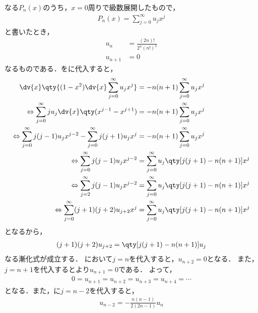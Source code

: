 \documentclass{report}
\begin{document}
      なる$P_n(x)$のうち，$x = 0$周りで級数展開したもので，
      \begin{align}
        P_n(x) = \sum_{j = 0}^{\infty}u_jx^j\label{legendre-polynominal-u-expantion}
      \end{align}
      と書いたとき，
      \begin{align}
        u_n &= \frac{(2n)!}{2^n(n!)^2}\label{legendre-polynominal-u-expantion-n} \\ 
        u_{n + 1} &= 0\label{legendre-polynominal-u-expantion-np1}
      \end{align}
      なるものである．をに代入すると，
      \begin{align}
        \dv{x}\qty{(1 - x^2)\dv{x}\sum_{j = 0}^{\infty}u_jx^j} &= -n(n + 1)\sum_{j = 0}^{\infty}u_jx^j \\ 
        \Leftrightarrow \sum_{j = 0}^{\infty}ju_j\dv{x}\qty(x^{j - 1} - x^{j + 1}) &= -n(n + 1)\sum_{j = 0}^{\infty}u_jx^j \\ 
        \Leftrightarrow \sum_{j = 0}^{\infty}j(j - 1)u_jx^{j - 2} - \sum_{j = 0}^{\infty}j(j + 1)u_jx^j &= -n(n + 1)\sum_{j = 0}^{\infty}u_jx^j \\ 
        \Leftrightarrow \sum_{j = 0}^{\infty}j(j - 1)u_jx^{j - 2} &= \sum_{j = 0}^{\infty}u_j\qty[j(j + 1) - n(n + 1)]x^j \\ 
        \Leftrightarrow \sum_{j = 2}^{\infty}j(j - 1)u_jx^{j - 2} &= \sum_{j = 0}^{\infty}u_j\qty[j(j + 1) - n(n + 1)]x^j \\ 
        \Leftrightarrow \sum_{j = 0}^{\infty}(j + 1)(j + 2)u_{j + 2}x^{j} &= \sum_{j = 0}^{\infty}u_j\qty[j(j + 1) - n(n + 1)]x^j 
      \end{align}
      となるから，
      \begin{align}
        (j + 1)(j + 2)u_{j + 2} = \qty[j(j + 1) - n(n + 1)]u_j\label{legendre-polynominal-u-expantion-recurr}
      \end{align}
      なる漸化式が成立する．
      において$j = n$を代入すると，$u_{n + 2} = 0$となる．
      また，$j = n + 1$を代入するとより$u_{n + 1} = 0$である．
      よって，
      \begin{align}
        0 = u_{n + 1} = u_{n + 2} = u_{n + 3} = u_{n + 4} = \cdots 
      \end{align}
      となる．また，に$j = n - 2$を代入すると，
      \begin{align}
        u_{n - 2} = -\frac{n(n - 1)}{2(2n - 1)}u_n\label{legendre-polynominal-u-expantion-recurr-2}
      \end{align}
\end{document}
